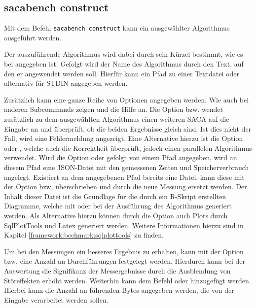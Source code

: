 \subsection{sacabench construct}

Mit dem Befehl \texttt{sacabench construct} kann ein ausgewählter Algorithmus ausgeführt werden. 
\par
Der auszuführende Algorithmus wird dabei durch sein Kürzel bestimmt, wie es bei  angegeben ist. 
Gefolgt wird der Name des Algorithmus durch den Text, auf den er angewendet werden soll. 
Hierfür kann ein Pfad zu einer Textdatei oder alternativ \termfont{-} für STDIN angegeben werden. 
\par
Zusätzlich kann eine ganze Reihe von Optionen angegeben werden. 
Wie auch bei anderen Subcommands zeigen  und  die Hilfe an. 
Die Option  bzw.  wendet zusätzlich zu dem ausgewählten Algorithmus einen weiteren SACA auf die Eingabe an und überprüft, ob die beiden Ergebnisse gleich sind. 
Ist dies nicht der Fall, wird eine Fehlermeldung angezeigt. 
Eine Alternative hierzu ist die Option  oder , welche auch die Korrektheit überprüft, jedoch einen parallelen Algorithmus verwendet. 
Wird die Option  oder  gefolgt von einem Pfad angegeben, wird an diesem Pfad eine JSON-Datei mit den gemessenen Zeiten und Speicherverbrauch angelegt. 
Existiert an dem angegebenen Pfad bereits eine Datei, kann diese mit der Option  bzw.  überschrieben und durch die neue Messung ersetzt werden. 
Der Inhalt dieser Datei ist die Grundlage für die durch ein R-Skript erstellten Diagramme, welche mit  oder  bei der Ausführung des Algorithmus generiert werden. 
Als Alternative hierzu können durch die Option  auch Plots durch SqlPlotTools und Latex generiert werden.
Weitere Informationen hierzu sind in Kapitel \ref{framework:bechmark:sqlplottools} zu finden.\par
Um bei den Messungen ein besseres Ergebnis zu erhalten, kann mit der Option  bzw.  eine Anzahl an Durchführungen festgelegt werden. 
Hierdurch kann bei der Auswertung die Signifikanz der Messergebnisse durch die Ausblendung von Störeffekten erhöht werden.
Weiterhin kann dem Befehl  oder  hinzugefügt werden. 
Hierbei kann die Anzahl an führenden Bytes angegeben werden, die von der Eingabe verarbeitet werden sollen.
